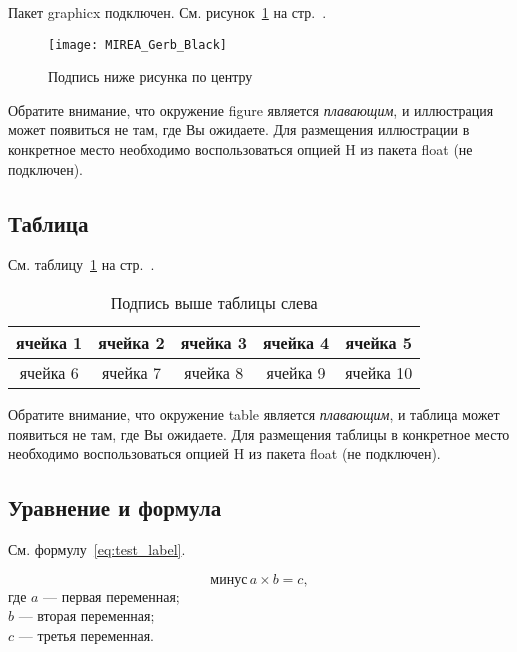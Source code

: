 \documentclass[14pt, a4paper, titlepage]{extarticle}
\begin{document}
Пакет graphicx подключен. См. рисунок~\ref{fig:test_label} на стр.~\pageref{fig:test_label}.

\begin{figure}[htb]
    \centering
    \texttt{[image: MIREA\_Gerb\_Black]}
    \parskip=6pt
    \caption{Подпись ниже рисунка по центру}
    \label{fig:test_label}
\end{figure}

Обратите внимание, что окружение figure является \emph{плавающим}, и иллюстрация может появиться не там, где Вы ожидаете. Для размещения иллюстрации в конкретное место необходимо воспользоваться опцией H из пакета float (не подключен).

\subsection{Таблица}

См. таблицу~\ref{tab:test_label} на стр.~\pageref{tab:test_label}.

\begin{table}[htb]
    \caption{Подпись выше таблицы слева}
    \centering
    \begin{tabular}{ |c|c|c|c|c| } 
        \hline
        ячейка 1 & ячейка 2 & ячейка 3 & ячейка 4 & ячейка 5 \\ \hline
        ячейка 6 & ячейка 7 & ячейка 8 & ячейка 9 & ячейка 10 \\ \hline
    \end{tabular}
    \label{tab:test_label}
\end{table}

Обратите внимание, что окружение table является \emph{плавающим}, и таблица может появиться не там, где Вы ожидаете. Для размещения таблицы в конкретное место необходимо воспользоваться опцией H из пакета float (не подключен).

\subsection{Уравнение и формула}

См. формулу~\ref{eq:test_label}.

\begin{equation}\label{eq:test_label}
    \text{минус}\,a\times b=c ,
\end{equation}
где $a$ --- первая переменная; \\
$b$ --- вторая переменная; \\
$c$ --- третья переменная.
\end{document}
